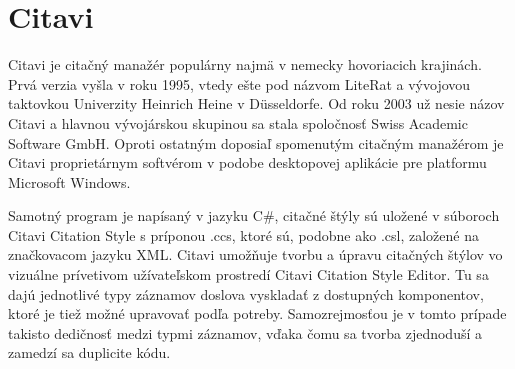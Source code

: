 \documentclass{fithesis3}
\begin{document}
	\section{Citavi}
	
	Citavi je citačný manažér populárny najmä v nemecky hovoriacich krajinách. Prvá verzia vyšla v roku 1995, vtedy ešte pod názvom LiteRat a vývojovou taktovkou Univerzity Heinrich Heine v Düsseldorfe. Od roku 2003 už nesie názov Citavi a hlavnou vývojárskou skupinou sa stala spoločnosť Swiss Academic Software GmbH. Oproti ostatným doposiaľ spomenutým citačným manažérom je Citavi proprietárnym softvérom v podobe desktopovej aplikácie pre platformu Microsoft Windows.

	Samotný program je napísaný v jazyku C#, citačné štýly sú uložené v súboroch Citavi Citation Style s príponou .ccs, ktoré sú, podobne ako .csl, založené na značkovacom jazyku XML. Citavi umožňuje tvorbu a úpravu citačných štýlov vo vizuálne prívetivom užívateľskom prostredí Citavi Citation Style Editor. Tu sa dajú jednotlivé typy záznamov doslova vyskladať z dostupných komponentov, ktoré je tiež možné upravovať podľa potreby. Samozrejmosťou je v tomto prípade takisto dedičnosť medzi typmi záznamov, vďaka čomu sa tvorba zjednoduší a zamedzí sa duplicite kódu.
\end{document}
